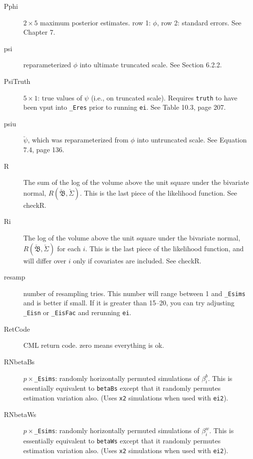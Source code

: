 \documentclass[11pt,titlepage]{article}
\newcommand{\bbetau}{\breve{\mathfrak B}}
\newcommand{\Sigmau}{\breve{\Sigma}}
\newcommand{\psiu}{\breve{\psi}}
\begin{document}
\begin{description}
\item[Pphi] $2\times 5$ maximum posterior estimates.  row 1: $\phi$,
  row 2: standard errors.  See Chapter 7.

\item[psi] reparameterized $\phi$ into ultimate truncated scale.  See
  Section 6.2.2.

\item[PsiTruth] $5\times 1$: true values of $\psi$ (i.e., on truncated
  scale).  Requires \texttt{truth} to have been vput into
  \texttt{\_Eres} prior to running \texttt{ei}. See Table 10.3, page
  207.

\item[psiu] $\psiu$, which was reparameterized from $\phi$ into
  untruncated scale.  See Equation 7.4, page 136.

\item[R] The sum of the log of the volume above the unit square under
  the bivariate normal, $R(\bbetau,\Sigmau)$.  This is the last piece
  of the likelihood function.  See checkR.

\item[Ri] The log of the volume above the unit square under the
  bivariate normal, $R(\bbetau,\Sigmau)$ for each $i$.  This is the
  last piece of the likelihood function, and will differ over $i$ only
  if covariates are included.  See checkR.

\item[resamp] number of resampling tries.  This number will range
  between 1 and \texttt{\_Esims} and is better if small.  If it is
  greater than 15--20, you can try adjusting \texttt{\_Eisn} or
  \texttt{\_EisFac} and rerunning \texttt{ei}.

\item[RetCode] CML return code.  zero means everything is ok.

\item[RNbetaBs] $p\times$\texttt{\_Esims}: randomly horizontally
  permuted simulations of $\beta_i^b$.  This is essentially equivalent
  to \texttt{betaBs} except that it randomly permutes estimation
  variation also.  (Uses \texttt{x2} simulations when used with
  \texttt{ei2}).

\item[RNbetaWs] $p\times$\texttt{\_Esims}: randomly horizontally
  permuted simulations of $\beta_i^w$.  This is essentially equivalent
  to \texttt{betaWs} except that it randomly permutes estimation
  variation also.  (Uses \texttt{x2} simulations when used with
  \texttt{ei2}).


\end{description}
\end{document}
